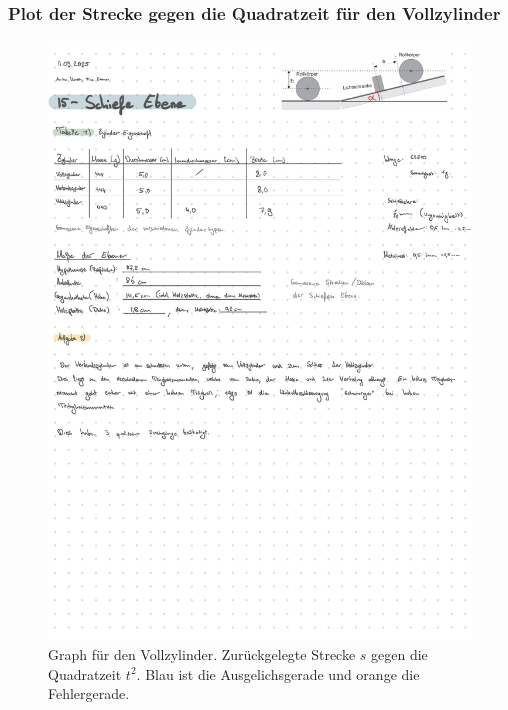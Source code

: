 \subsubsection*{Plot der Strecke gegen die Quadratzeit für den Vollzylinder}
\begin{figure}[!ht]
    \centering
    \hspace*{-2.35cm}
    \includegraphics[width=1.3\textwidth, page=3]{Protokolle/15/Chapter/Messprotokoll}
    \caption{Graph für den Vollzylinder. Zurückgelegte Strecke $s$ gegen die Quadratzeit $t^2$. Blau ist die Ausgelichsgerade und orange die Fehlergerade.}
    \label{fig:voll}
\end{figure}

\newpage
